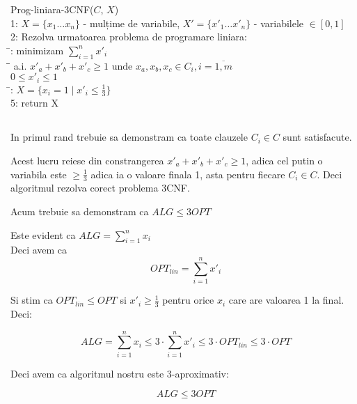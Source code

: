 \documentclass[a4paper]{report} %
\begin{document}
\begin{tabbing}
Prog-liniara-3CNF($C$, $X$)\\
1: $X=\{x_{1}\dots x_{n}\}$ - mulțime de variabile, $X'=\{x'_{1}\dots x'_{n}\}$ - variabilele $\in [0,1]$ \\ 
2: Rezolva urmatoarea problema de programare liniara:\\
\hspace{2em}\= : \> minimizam $\sum_{i=1}^{n}x'_{i}$ \\
\hspace{2em}\=\hspace{2em}\= \kill 
\> a.i. \> $x'_{a}+x'_{b}+x'_{c}\geq 1 \text{ unde } x_{a},x_{b},x_{c}\in C_{i}, i=\overline{1,m}$ \\
\> \> $0\leq x'_{i}\leq 1$\\
\hspace{2em}\=: $X=\{x_{i}=1 \mid x'_{i}\leq \frac{1}{3}\}$\\
5: return X
\end{tabbing}

\subsection{}

In primul rand trebuie sa demonstram ca toate clauzele $C_{i}\in C$ sunt satisfacute.

Acest lucru reiese din constrangerea $x'_{a}+x'_{b}+x'_{c}\geq 1$, adica cel putin o variabila este $\geq \frac{1}{3}$
adica ia o valoare finala 1, asta pentru fiecare $C_{i}\in C$. Deci algoritmul rezolva corect problema 3CNF.

Acum trebuie sa demonstram ca $ALG\leq 3OPT$

Este evident ca $ALG=\sum_{i=1}^{n}x_{i}$\\

Deci avem ca \[OPT_{lin}=\sum_{i=1}^{n}x'_{i}\]

Si stim ca $OPT_{lin}\leq OPT$ si $x'_{i}\geq \frac{1}{3}$ pentru orice $x_{i}$ care are valoarea 1 la final. Deci:

\[ALG=\sum_{i=1}^{n}x_{i}\leq 3\cdot \sum_{i=1}^{n}x'_{i}\leq 3\cdot OPT_{lin} \leq 3\cdot OPT\]

Deci avem ca algoritmul nostru este 3-aproximativ:

\[ALG\leq 3OPT\]
\end{document}
